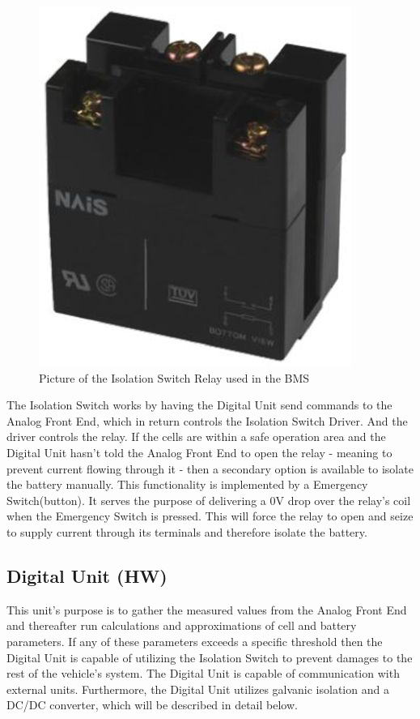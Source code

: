 \begin{figure}[H]
	\centering
	\includegraphics[width=0.3\linewidth]{Hardware/Pictures/BMSRelay}
	\caption[Empty]{Picture of the Isolation Switch Relay used in the BMS\footnotemark}
	\label{fig:BMSRelay}
\end{figure}

The Isolation Switch works by having the Digital Unit send commands to the Analog Front End, which in return controls the Isolation Switch Driver. And the driver controls the relay. If the cells are within a safe operation area and the Digital Unit hasn't told the Analog Front End to open the relay - meaning to prevent current flowing through it - then a secondary option is available to isolate the battery manually. This functionality is implemented by a Emergency Switch(button). It serves the purpose of delivering a 0V drop over the relay's coil when the Emergency Switch is pressed. This will force the relay to open and seize to supply current through its terminals and therefore isolate the battery.

\subsection{Digital Unit (HW)}
This unit's purpose is to gather the measured values from the Analog Front End and thereafter run calculations and approximations of cell and battery parameters. If any of these parameters exceeds a specific threshold then the Digital Unit is capable of utilizing the Isolation Switch to prevent damages to the rest of the vehicle's system. The Digital Unit is capable of communication with external units. Furthermore, the Digital Unit utilizes galvanic isolation and a DC/DC converter, which will be described in detail below. 


